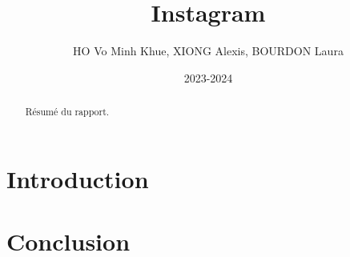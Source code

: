 \documentclass[a4paper,11pt]{article}
\title{Instagram}
\author{HO Vo Minh Khue, XIONG Alexis, BOURDON Laura}
\date{2023-2024}
\begin{document}
\maketitle

\begin{abstract}
  Résumé du rapport.
\end{abstract}


\section{Introduction}




\section{Conclusion}




\end{document}
